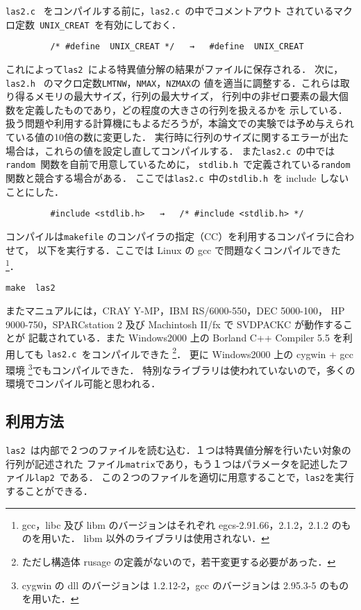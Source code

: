 {\tt las2.c } をコンパイルする前に，{\tt las2.c }の中でコメントアウト
されているマクロ定数\verb| UNIX_CREAT |を有効にしておく．
\begin{verbatim}
         /* #define  UNIX_CREAT */   →   #define  UNIX_CREAT
\end{verbatim}
\noindent
これによって{\tt las2 }による特異値分解の結果がファイルに保存される．
次に，{\tt las2.h } のマクロ定数\verb|LMTNW|，\verb|NMAX|，\verb|NZMAX|の
値を適当に調整する．これらは取り得るメモリの最大サイズ，行列の最大サイズ，
行列中の非ゼロ要素の最大個数を定義したものであり，どの程度の大きさの行列を扱えるかを
示している．
扱う問題や利用する計算機にもよるだろうが，本論文での実験では予め与えられている値の10倍の数に変更した．
実行時に行列のサイズに関するエラーが出た場合は，これらの値を設定し直してコンパイルする．
また{\tt las2.c }の中では{\tt random }関数を自前で用意しているために，
{\tt stdlib.h }で定義されている{\tt random }関数と競合する場合がある．
ここでは{\tt las2.c }中の{\tt stdlib.h }を include しないことにした．
\begin{verbatim}
         #include <stdlib.h>   →   /* #include <stdlib.h> */
\end{verbatim}
\noindent
コンパイルは{\tt makefile} のコンパイラの指定（CC）を利用するコンパイラに合わせて，
以下を実行する．ここでは Linux の gcc で問題なくコンパイルできた
\footnote{gcc，libc 及び libm のバージョンはそれぞれ egcs-2.91.66，2.1.2，2.1.2 のものを用いた．
libm 以外のライブラリは使用されない．}．

\begin{center}
{\tt   make\ \ las2}
\end{center}

またマニュアルには，CRAY Y-MP，IBM RS/6000-550，DEC 5000-100，
HP 9000-750，SPARCstation 2 及び Machintosh II/fx で SVDPACKC が動作することが
記載されている．また Windows2000 上の Borland C++ Compiler 5.5 を利用しても
{\tt las2.c }をコンパイルできた
\footnote{ただし構造体 rusage の定義がないので，若干変更する必要があった．}．
更に Windows2000 上の cygwin + gcc 環境
\footnote{cygwin の dll のバージョンは 1.2.12-2，gcc のバージョンは
2.95.3-5 のものを用いた．}でもコンパイルできた．
特別なライブラリは使われていないので，多くの環境でコンパイル可能と思われる．

\subsection{利用方法}

{\tt las2 }は内部で２つのファイルを読む込む．１つは特異値分解を行いたい対象の行列が記述された
ファイル{\tt matrix}であり，もう１つはパラメータを記述したファイル{\tt lap2 }である．
この２つのファイルを適切に用意することで，{\tt las2}を実行することができる．

